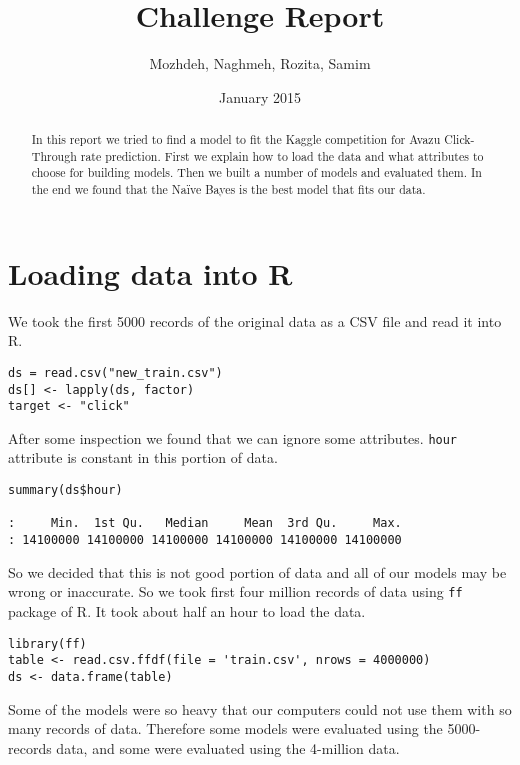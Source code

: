 \documentclass[11pt,a4paper]{article}
\author{Mozhdeh, Naghmeh, Rozita, Samim}
\date{January 2015}
\title{Challenge Report}
\begin{document}
\maketitle
\begin{abstract}
In this report we tried to find a model to fit the Kaggle competition for Avazu Click-Through rate prediction.
First we explain how to load the data and what attributes to choose for building models. Then we built a number of
models and evaluated them. In the end we found that the Naïve Bayes is the best model that fits our data.
\end{abstract}

\section{Loading data into R}
\label{sec-1}
We took the first 5000 records of the original data as a CSV file and read it into
R.

\begin{verbatim}
ds = read.csv("new_train.csv")
ds[] <- lapply(ds, factor)
target <- "click"
\end{verbatim}

After some inspection we found that we can ignore some attributes. \texttt{hour} attribute is
constant in this portion of data.

\begin{verbatim}
summary(ds$hour)

:     Min.  1st Qu.   Median     Mean  3rd Qu.     Max. 
: 14100000 14100000 14100000 14100000 14100000 14100000
\end{verbatim}

So we decided that this is not good portion of data and all of our models may be
wrong or inaccurate. So we took first four million records of data using \texttt{ff} package
of R. It took about half an hour to load the data.

\begin{verbatim}
library(ff)
table <- read.csv.ffdf(file = 'train.csv', nrows = 4000000)
ds <- data.frame(table)
\end{verbatim}

Some of the models were so heavy that our computers could not
use them with so many records of data. Therefore some models were
evaluated using the 5000-records data, and some were
evaluated using the 4-million data.
\end{document}
